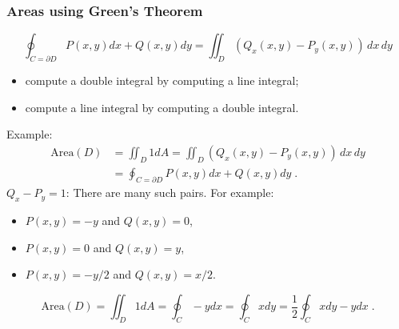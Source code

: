 \begin{frame}
\small
  \frametitle{Areas using Green's Theorem}

  $$\oint_{C=\partial D} P(x,y) dx + Q(x,y) dy = \iint_D (Q_x(x,y) - P_y(x,y)) \, dx\, dy$$
  
\begin{itemize}
  \item compute a double integral by computing a line integral;
  \item compute a line integral by computing a double integral.
\end{itemize}

Example:
%
\begin{align*}
\text{Area}(D) & = \iint_D 1 dA = \iint_D (Q_x(x,y) - P_y(x,y)) \, dx\, dy \\
& = \oint_{C=\partial D} P(x,y) dx + Q(x,y) dy\; .
\end{align*}
%
$Q_x - P_y = 1$: There are many such pairs. For example:
%
\begin{itemize}
  \item $P(x,y) = -y$ and $Q(x,y) = 0$,
  \item $P(x,y) = 0$ and $Q(x,y) = y$,
  \item $P(x,y) = -y/2$ and $Q(x,y) = x/2$.
\end{itemize}
%
$$\text{Area}(D) = \iint_D 1 dA = \oint_C -ydx = \oint_C xdy = \frac{1}{2}\oint_C xdy-ydx\; .$$
\end{frame}



